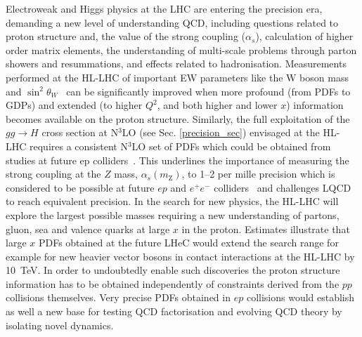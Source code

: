 Electroweak and Higgs physics at the LHC are entering the precision era, demanding a new level of understanding QCD, including questions related to proton structure and, the value of the strong coupling ($\alpha_s$), calculation of higher order matrix elements, the understanding of multi-scale problems through parton showers and resummations, and effects related to hadronisation.
Measurements performed at the HL-LHC of important EW parameters like the W boson mass~\cite{ATL-Wmass} and $\sin^2\theta_W$~\cite{ATL} can be significantly improved when more profound (from PDFs to GDPs) and extended (to higher $Q^2$, and both higher and lower $x$) information becomes available on the proton structure.
Similarly, the full exploitation of the $gg \to H$ cross section at N$^3$LO (see Sec. \ref{precision_sec}) envisaged at the HL-LHC requires a consistent N$^3$LO set of PDFs which could be obtained from studies at future ep colliders~\cite{Bruening:2013bga}.
This underlines the importance of measuring the strong coupling at the $Z$ mass, $\alpha_s(m_\text{Z})$,
to 1--2 per mille precision which is considered to be possible at future $ep$ and $e^+e^-$ colliders~\cite{dEnterria:2019its} and challenges LQCD to reach equivalent precision. 
In the search for new physics, the HL-LHC will explore the largest possible masses  requiring a new understanding of partons, gluon, sea and valence quarks at large $x$ in the proton. Estimates illustrate that large $x$ PDFs obtained at the future LHeC would extend the search range for example for new heavier vector bosons in contact interactions at the HL-LHC by 10~TeV. In order to undoubtedly enable such discoveries the proton structure information has to be obtained independently of constraints derived from the $pp$ collisions themselves. 
Very precise PDFs obtained in $ep$ collisions would establish as well a new base for testing QCD factorisation and evolving QCD theory by isolating novel dynamics. 
